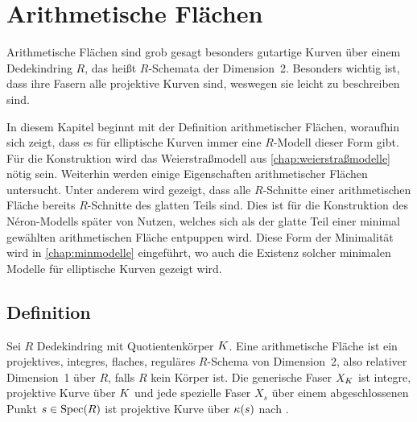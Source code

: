 \chapter{Arithmetische Flächen}\label{chap:arithmetischeflächen}
Arithmetische Flächen sind grob gesagt besonders gutartige Kurven über
einem Dedekindring $R$, das heißt $R$-Schemata der Dimension~2.
Besonders wichtig ist, dass ihre Fasern alle projektive Kurven sind,
weswegen sie leicht zu beschreiben sind.

In diesem Kapitel beginnt mit der Definition arithmetischer Flächen,
woraufhin sich zeigt, dass es für elliptische Kurven immer eine
$R$-Modell dieser Form gibt. Für die Konstruktion wird das Weierstraßmodell
aus \autoref{chap:weierstraßmodelle} nötig sein.
Weiterhin werden einige Eigenschaften arithmetischer Flächen
untersucht. Unter anderem wird gezeigt, dass alle $R$-Schnitte einer
arithmetischen Fläche bereits $R$-Schnitte des glatten Teils
sind. Dies ist für die Konstruktion des Néron-Modells später von
Nutzen, welches sich als der glatte Teil einer minimal gewählten
arithmetischen Fläche entpuppen wird.
Diese Form der Minimalität wird in \autoref{chap:minmodelle}
eingeführt, wo auch die Existenz solcher minimalen Modelle für
elliptische Kurven gezeigt wird.

\section{Definition}
\begin{Definition}
  Sei $R$ Dedekindring mit Quotientenkörper $K$.
  Eine arithmetische Fläche ist ein projektives, integres, flaches,
  reguläres $R$-Schema von Dimension~2, also relativer Dimension~1 über
  $R$, falls $R$ kein Körper ist.
  Die generische Faser $X_{K}$ ist integre, projektive Kurve über $K$
  und jede spezielle Faser $X_s$ über einem abgeschlossenen Punkt
  $s\in\operatorname{Spec}(R)$ ist projektive Kurve über $\kappa(s)$ nach
  \cite[Lemma~8.3.3]{liu}.
\end{Definition}

